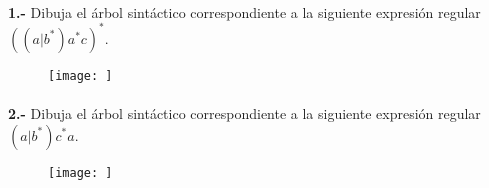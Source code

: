 \documentclass[11pt,a4paper]{report}
\begin{document}
\paragraph{}

\paragraph{}
\textbf{1.-} Dibuja el árbol sintáctico correspondiente a la siguiente expresión regular $ ((a|b^*)a^*c)^* $. 
\begin{figure}[ht!]
\centering
\texttt{[image: ]}
\end{figure}\paragraph{}
\textbf{2.-} Dibuja el árbol sintáctico correspondiente a la siguiente expresión regular $ (a|b^*)c^*a $. 
\begin{figure}[ht!]
\centering
\texttt{[image: ]}
\end{figure}
\end{document}
